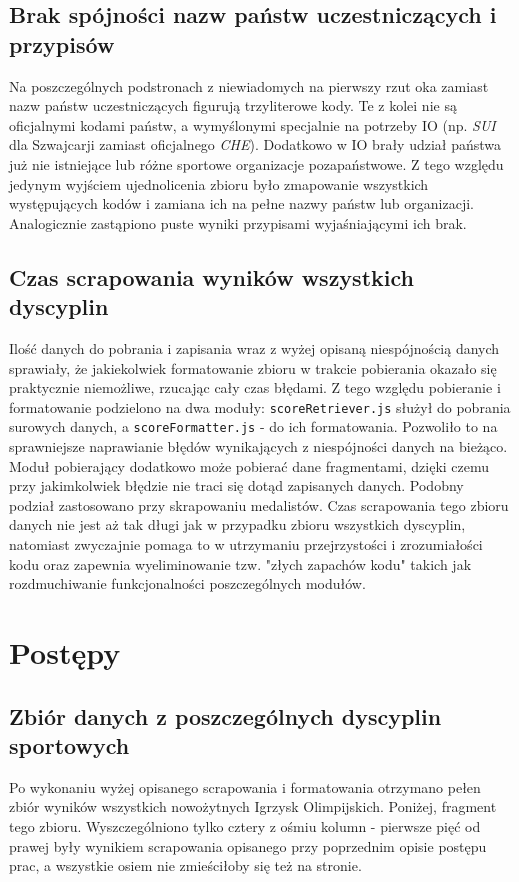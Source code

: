 \documentclass[a4paper,11pt]{article}
\begin{document}
\subsection{Brak spójności nazw państw uczestniczących i przypisów}
Na poszczególnych podstronach z niewiadomych na pierwszy rzut oka zamiast nazw
państw uczestniczących figurują trzyliterowe kody. Te z kolei nie są oficjalnymi
kodami państw, a wymyślonymi specjalnie na potrzeby IO (np. \textit{SUI} dla
Szwajcarji zamiast oficjalnego \textit{CHE}). Dodatkowo w IO brały udział państwa
już nie istniejące lub różne sportowe organizacje pozapaństwowe. Z tego względu
jedynym wyjściem ujednolicenia zbioru było zmapowanie wszystkich występujących
kodów i zamiana ich na pełne nazwy państw lub organizacji. Analogicznie zastąpiono
puste wyniki przypisami wyjaśniającymi ich brak.

\subsection{Czas scrapowania wyników wszystkich dyscyplin}
Ilość danych do pobrania i zapisania wraz z wyżej opisaną niespójnością danych
sprawiały, że jakiekolwiek formatowanie zbioru w trakcie pobierania okazało się
praktycznie niemożliwe, rzucając cały czas błędami. Z tego względu pobieranie 
i formatowanie podzielono na dwa moduły: \verb|scoreRetriever.js| służył do
pobrania surowych danych, a \verb|scoreFormatter.js| - do ich formatowania.
Pozwoliło to na sprawniejsze naprawianie błędów wynikających z niespójności danych
na bieżąco. Moduł pobierający dodatkowo może pobierać dane fragmentami, dzięki
czemu przy jakimkolwiek błędzie nie traci się dotąd zapisanych danych. 
\newline
Podobny podział zastosowano przy skrapowaniu medalistów. Czas scrapowania tego
zbioru danych nie jest aż tak długi jak w przypadku zbioru wszystkich dyscyplin,
natomiast zwyczajnie pomaga to w utrzymaniu przejrzystości i zrozumiałości 
kodu oraz zapewnia wyeliminowanie tzw. "złych zapachów kodu" takich jak
rozdmuchiwanie funkcjonalności poszczególnych modułów.

\section{Postępy}
\subsection{Zbiór danych z poszczególnych dyscyplin sportowych}
Po wykonaniu wyżej opisanego scrapowania i formatowania otrzymano pełen zbiór
wyników wszystkich nowożytnych Igrzysk Olimpijskich. Poniżej, fragment tego zbioru.
Wyszczególniono tylko cztery z ośmiu kolumn - pierwsze pięć od prawej były wynikiem
scrapowania opisanego przy poprzednim opisie postępu prac, a wszystkie osiem nie
zmieściłoby się też na stronie.
\begin{center}
\end{center}
\end{document}
